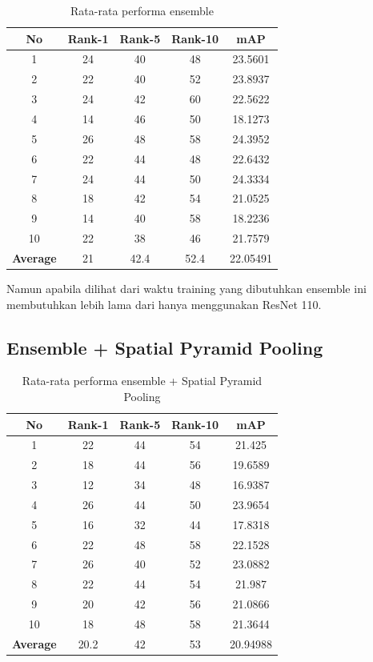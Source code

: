 \begin{longtable}{|c|c|c|c|c|}
	\caption{Rata-rata performa ensemble }
	\label{tabel: 19}\\
	\hline
	\rowcolor[HTML]{C0C0C0}
	\textbf{No} &\textbf{Rank-1} & \textbf{Rank-5} & \textbf{Rank-10} & \textbf{mAP} \\
	\hline
	1 &24 &40 &48 &23.5601 \\
	2 &22 &40 &52 &23.8937 \\
	3 &24 &42 &60 &22.5622 \\
	4 &14 &46 &50 &18.1273 \\
	5 &26 &48 &58 &24.3952 \\
	6 &22 &44 &48 &22.6432 \\
	7 &24 &44 &50 &24.3334 \\
	8 &18 &42 &54 &21.0525 \\
	9 &14 &40 &58 &18.2236 \\
	10 &22 &38 &46 &21.7579 \\
	\hline
	\textbf{Average} & 21 & 42.4 & 52.4 &22.05491 \\
	\hline
\end{longtable}

Namun apabila dilihat dari waktu training yang dibutuhkan ensemble ini membutuhkan lebih lama dari hanya menggunakan ResNet 110.

\subsection{Ensemble + Spatial Pyramid Pooling}

\begin{longtable}{|c|c|c|c|c|}
	\caption{Rata-rata performa ensemble + Spatial Pyramid Pooling }
	\label{tabel: 20}\\
	\hline
	\rowcolor[HTML]{C0C0C0}
	\textbf{No} &\textbf{Rank-1} & \textbf{Rank-5} & \textbf{Rank-10} & \textbf{mAP} \\
	\hline
	1 &22 &44 &54 &21.425 \\
	2 &18 &44 &56 &19.6589 \\
	3 &12 &34 &48 &16.9387 \\
	4 &26 &44 &50 &23.9654 \\
	5 &16 &32 &44 &17.8318 \\
	6 &22 &48 &58 &22.1528 \\
	7 &26 &40 &52 &23.0882 \\
	8 &22 &44 &54 &21.987 \\
	9 &20 &42 &56 &21.0866 \\
	10 &18 &48 &58 &21.3644 \\
	\hline
	\textbf{Average} & 20.2 & 42 & 53 & 20.94988 \\
	\hline
\end{longtable}

